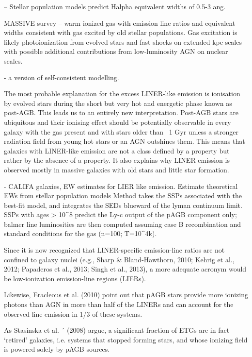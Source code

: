 \citet{Gomes+2016, Belfiore+2016} -- Stellar population models predict Halpha equivalent widths of 0.5-3 ang.

\citet{Pandya+2017} MASSIVE survey -- warm ionized gas with emission line ratios and equivalent widths consistent with gas excited by old stellar populations. Gas excitation is likely photoionization from evolved stars and fast shocks on extended kpc scales with possible additional contributions from low-luminosity AGN on nuclear scales. 

\citet{Hirschmann+2017} - a version of self-consistent modelling.

\citet{Singh+2013}The most probable explanation for the excess LINER-like emission is ionisation by evolved stars during the short but very hot and energetic phase known as post-AGB. This leads us to an entirely new interpretation. Post-AGB stars are ubiquitous and their ionising effect should be potentially observable in every galaxy with the gas present and with stars older than ~1 Gyr unless a stronger radiation field from young hot stars or an AGN outshines them. This means that galaxies with LINER-like emission are not a class defined by a property but rather by the absence of a property. It also explains why LINER emission is observed mostly in massive galaxies with old stars and little star formation.

\citet{Gomes+2016} - CALIFA galaxies, EW estimates for LIER like emission. Estimate theoretical EWs from stellar population models Method takes the SSPs associated with the best-fit model, and integrates the SEDs blueward of the lyman continuum limit. SSPs with ages > 10^8 predict the Ly-c output of the pAGB component only; balmer line luminosities are then computed assuming case B recombination and standard conditions for the gas (n=100; T=10^4k).

 Since it is now recognized that LINER-specific emission-line ratios
are not confined to galaxy nuclei (e.g., Sharp & Bland-Hawthorn,
2010; Kehrig et al., 2012; Papaderos et al., 2013; Singh et al., 2013), a
more adequate acronym would be low-ionization emission-line regions
(LIERs).

Likewise, Eracleous et al. (2010) point
out that pAGB stars provide more ionizing photons than AGN
in more than half of the LINERs and can account for the observed
line emission in 1/3 of these systems. 

As
Stasinska et al. ´ (2008) argue, a significant fraction of ETGs are
in fact ‘retired’ galaxies, i.e. systems that stopped forming stars,
and whose ionizing field is powered solely by pAGB sources.

